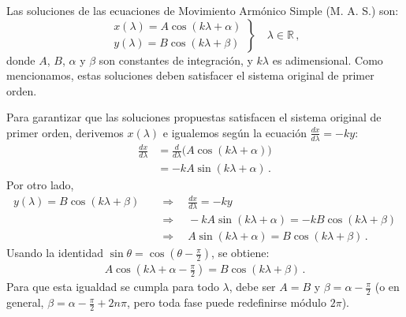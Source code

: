 \documentclass[../apunte_mecanica_clasica.tex]{subfiles}%
\begin{document}
Las soluciones de las ecuaciones de Movimiento Armónico Simple (M. A. S.) son:
\begin{equation*}
\left.
\begin{aligned}
  x(\lambda) = A \cos(k\lambda + \alpha)\\
  y(\lambda) = B \cos(k\lambda + \beta)
\end{aligned}
\right\} \quad \lambda \in \mathbb{R} \,,
\end{equation*}
donde $A$, $B$, $\alpha$ y $\beta$ son constantes de integración, y $k\lambda$ es adimensional. Como mencionamos, estas soluciones deben satisfacer el sistema original de primer orden.

Para garantizar que las soluciones propuestas satisfacen el sistema original de primer orden, derivemos $x(\lambda)$ e igualemos según la ecuación $\frac{dx}{d\lambda} = -k y$:
\begin{align*}
\frac{dx}{d\lambda} &= \frac{d}{d\lambda}\big(A\cos(k\lambda + \alpha)\big) \\[2pt]
&= -kA\sin(k\lambda + \alpha) \,.
\end{align*}
Por otro lado,
\begin{align*}
y(\lambda) = B\cos(k\lambda + \beta) \quad
&\Rightarrow \quad  \frac{dx}{d\lambda} = -k y \\[4pt]
&\Rightarrow \quad-kA\sin(k\lambda + \alpha) = -kB\cos(k\lambda + \beta) \\[4pt]
&\Rightarrow \quad A\sin(k\lambda + \alpha) = B\cos(k\lambda + \beta) \,.
\end{align*}
Usando la identidad $\sin\theta = \cos(\theta - \frac{\pi}{2})$, se obtiene:
\begin{align*}
A\cos\left(k\lambda + \alpha - \frac{\pi}{2}\right) = B\cos(k\lambda + \beta) \,.
\end{align*}
Para que esta igualdad se cumpla para todo $\lambda$, debe ser $A = B$ y $\beta = \alpha - \frac{\pi}{2}$ (o en general, $\beta = \alpha - \frac{\pi}{2} + 2n\pi$, pero toda fase puede redefinirse módulo $2\pi$).
\end{document}
